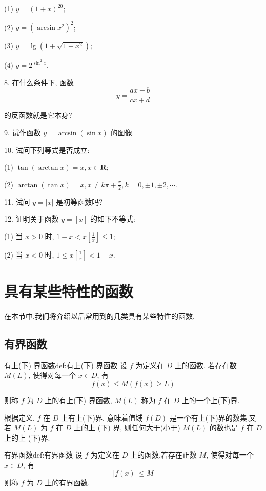 (1) $y=(1+x)^{20}$;

(2) $y=\left(\arcsin x^{2}\right)^{2}$;

(3) $y=\lg \left(1+\sqrt{1+x^{2}}\right)$;

(4) $y=2^{\sin ^{2} x}$.

8. 在什么条件下, 函数
\[
y=\frac{a x+b}{c x+d}
\]

的反函数就是它本身?

9. 试作函数 $y=\arcsin (\sin x)$ 的图像.

10. 试问下列等式是否成立:

(1) $\tan (\arctan x)=x, x \in \mathbf{R}$;

(2) $ \arctan (\tan x)=x, x \neq k \pi+\frac{\pi}{2}, k=0, \pm 1, \pm 2, \cdots .$

11. 试问 $y=|x|$ 是初等函数吗?

12. 证明关于函数 $y=[x]$ 的如下不等式:

(1) 当 $x>0$ 时, $1-x<x\left[\frac{1}{x}\right] \leqslant 1$;

(2) 当 $x<0$ 时, $1 \leqslant x\left[\frac{1}{x}\right]<1-x$.

\section{具有某些特性的函数}

在本节中,我们将介绍以后常用到的几类具有某些特性的函数.

\subsection{有界函数}
\begin{definition}{有上(下) 界函数}{def:有上(下) 界函数}
	设 $f$ 为定义在 $D$ 上的函数. 若存在数 $M(L)$, 使得对每一个 $x \in D$, 有
	\[
	f(x) \leqslant M(f(x) \geqslant L)
	\]

	则称 $f$ 为 $D$ 上的有上(下) 界函数, $M(L)$ 称为 $f$ 在 $D$ 上的一个上(下)界.
\end{definition}


根据定义, $f$ 在 $D$ 上有上(下)界, 意味着值域 $f(D)$ 是一个有上(下)界的数集.又若 $M(L)$ 为 $f$ 在 $D$ 上的上 (下) 界, 则任何大于(小于) $M(L)$ 的数也是 $f$ 在 $D$ 上的上 (下)界.

\begin{definition}{有界函数}{def:有界函数}
	设 $f$ 为定义在 $D$ 上的函数.若存在正数 $M$, 使得对每一个 $x \in D$, 有
	\[
	|f(x)| \leqslant M \tag{1}
	\]
则称 $f$ 为 $D$ 上的有界函数.
\end{definition}

